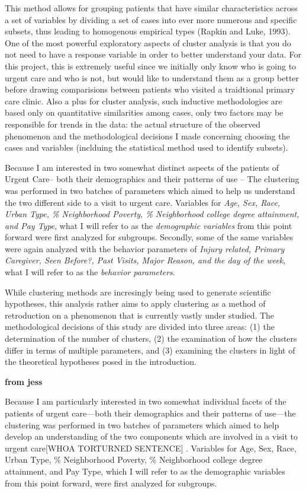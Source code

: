 \documentclass[12pt,twoside]{reedthesis}
\begin{document}
  This method allows for grouping patients that have similar
  characteristics across a set of variables by dividing a set of cases
  into ever more numerous and specific subsets, thus leading to homogenous
  empirical types (Rapkin and Luke, 1993). One of the most powerful
  exploratory aspects of cluster analysis is that you do not need to have
  a response variable in order to better understand your data. For this
  project, this is extremely useful since we initially only know who is
  going to urgent care and who is not, but would like to understand them
  as a group better before drawing comparisions between patients who
  visited a traidtional primary care clinic. Also a plus for cluster
  analysis, such inductive methodologies are based only on quantitative
  similarities among cases, only two factors may be responsible for trends
  in the data: the actual structure of the observed phenomenon and the
  methodological decisions I made concerning choosing the cases and
  variables (inclduing the statistical method used to identify subsets).
  
  Because I am interested in two somewhat distinct aspects of the patients
  of Urgent Care-- both their demographics and their patterns of use --
  The clustering was performed in two batches of parameters which aimed to
  help us understand the two different side to a visit to urgent care.
  Variables for \emph{Age, Sex, Race, Urban Type, \% Neighborhood Poverty,
  \% Neighborhood college degree attainment, and Pay Type}, what I will
  refer to as the \emph{demographic variables} from this point forward
  were first analyzed for subgroups. Secondly, some of the same variables
  were again analyzed with the behavior parameters of \emph{Injury
  related, Primary Caregiver, Seen Before?, Past Visits, Major Reason, and
  the day of the week}, what I will refer to as the \emph{behavior
  parameters}.
  
  While clustering methods are incresingly being used to generate
  scientific hypotheses, this analysis rather aims to apply clustering as
  a method of retroduction on a phenomenon that is currently vastly under
  studied. The methodological decisions of this study are divided into
  three areas: (1) the determination of the number of clusters, (2) the
  examination of how the clusters differ in terms of multiple parameters,
  and (3) examining the clusters in light of the theoretical hypotheses
  posed in the introduction.
  
  \textbf{from jess}
  
  Because I am particularly interested in two somewhat individual facets
  of the patients of urgent care---both their demographics and their
  patterns of use---the clustering was performed in two batches of
  parameters which aimed to help develop an understanding of the two
  components which are involved in a visit to urgent care{[}WHOA TORTURNED
  SENTENCE{]} . Variables for Age, Sex, Race, Urban Type, \% Neighborhood
  Poverty, \% Neighborhood college degree attainment, and Pay Type, which
  I will refer to as the demographic variables from this point forward,
  were first analyzed for subgroups.
  
\end{document}
